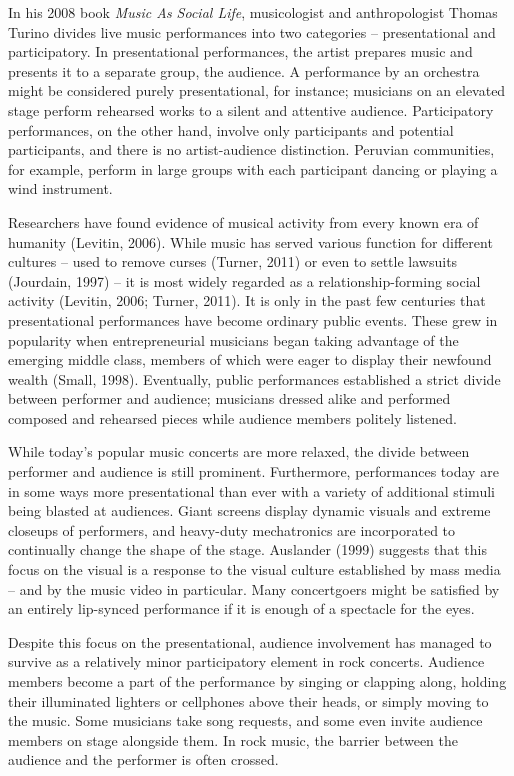 In his 2008 book \textit{Music As Social Life}, musicologist and anthropologist Thomas Turino divides live music performances into two categories -- presentational and participatory. In presentational performances, the artist prepares music and presents it to a separate group, the audience. A performance by an orchestra might be considered purely presentational, for instance; musicians on an elevated stage perform rehearsed works to a silent and attentive audience. Participatory performances, on the other hand, involve only participants and potential participants, and there is no artist-audience distinction. Peruvian communities, for example, perform in large groups with each participant dancing or playing a wind instrument.

Researchers have found evidence of musical activity from every known era of humanity (Levitin, 2006). While music has served various function for different cultures -- used to remove curses (Turner, 2011) or even to settle lawsuits (Jourdain, 1997) -- it is most widely regarded as a relationship-forming social activity (Levitin, 2006; Turner, 2011). It is only in the past few centuries that presentational performances have become ordinary public events. These grew in popularity when entrepreneurial musicians began taking advantage of the emerging middle class, members of which were eager to display their newfound wealth (Small, 1998). Eventually, public performances established a strict divide between performer and audience; musicians dressed alike and performed composed and rehearsed pieces while audience members politely listened.

While today's popular music concerts are more relaxed, the divide between performer and audience is still prominent. Furthermore, performances today are in some ways more presentational than ever with a variety of additional stimuli being blasted at audiences. Giant screens display dynamic visuals and extreme closeups of performers, and heavy-duty mechatronics are incorporated to continually change the shape of the stage. Auslander (1999) suggests that this focus on the visual is a response to the visual culture established by mass media -- and by the music video in particular. Many concertgoers might be satisfied by an entirely lip-synced performance if it is enough of a spectacle for the eyes.

Despite this focus on the presentational, audience involvement has managed to survive as a relatively minor participatory element in rock concerts. Audience members become a part of the performance by singing or clapping along, holding their illuminated lighters or cellphones above their heads, or simply moving to the music. Some musicians take song requests, and some even invite audience members on stage alongside them. In rock music, the barrier between the audience and the performer is often crossed.

